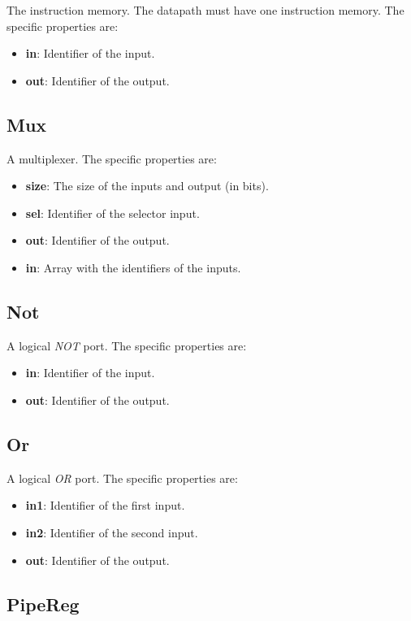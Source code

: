 \documentclass[11pt,a4paper,twoside,titlepage]{report}
\begin{document}
The instruction memory. The datapath must have one instruction memory.
The specific properties are:
\begin{itemize}
	\item \textbf{in}: Identifier of the input.
	\item \textbf{out}: Identifier of the output.
\end{itemize}

\subsection{Mux}

A multiplexer. The specific properties are:
\begin{itemize}
	\item \textbf{size}: The size of the inputs and output (in bits).
	\item \textbf{sel}: Identifier of the selector input.
	\item \textbf{out}: Identifier of the output.
	\item \textbf{in}: Array with the identifiers of the inputs.
\end{itemize}

\subsection{Not}

A logical \textit{NOT} port. The specific properties are:
\begin{itemize}
	\item \textbf{in}: Identifier of the input.
	\item \textbf{out}: Identifier of the output.
\end{itemize}

\subsection{Or}

A logical \textit{OR} port. The specific properties are:
\begin{itemize}
	\item \textbf{in1}: Identifier of the first input.
	\item \textbf{in2}: Identifier of the second input.
	\item \textbf{out}: Identifier of the output.
\end{itemize}

\subsection{PipeReg}
\end{document}
